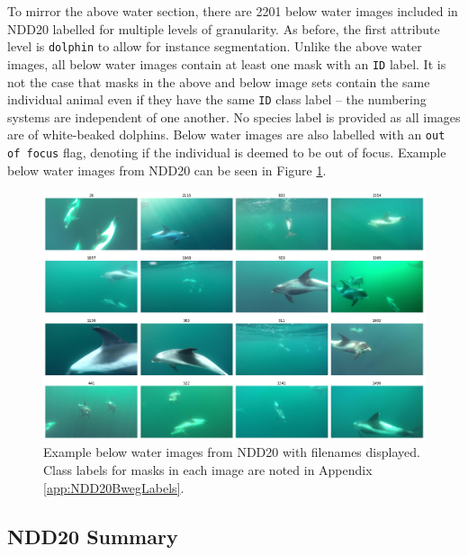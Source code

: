 To mirror the above water section, there are 2201 below water images included in NDD20 labelled for multiple levels of granularity. As before, the first attribute level is \texttt{dolphin} to allow for instance segmentation. Unlike the above water images, all below water images contain at least one mask with an \texttt{ID} label. It is not the case that masks in the above and below image sets contain the same individual animal even if they have the same \texttt{ID} class label -- the numbering systems are independent of one another. No species label is provided as all images are of white-beaked dolphins. Below water images are also labelled with an \texttt{out of focus} flag, denoting if the individual is deemed to be out of focus. Example below water images from NDD20 can be seen in Figure \ref{fig:below-water-example}.

\begin{figure}
	\begin{center}
		\includegraphics[scale=0.3]{Chapter4/figs/bweg-tiled.png}
	\end{center}
	\caption[Example below water images from NDD20 with filenames displayed.]{Example below water images from NDD20 with filenames displayed. Class labels for masks in each image are noted in Appendix \ref{app:NDD20BwegLabels}.}
	\label{fig:below-water-example}
\end{figure}

\subsection{NDD20 Summary}\label{ch:NDD,sec:NDD20,sub:NDD20Summary}

